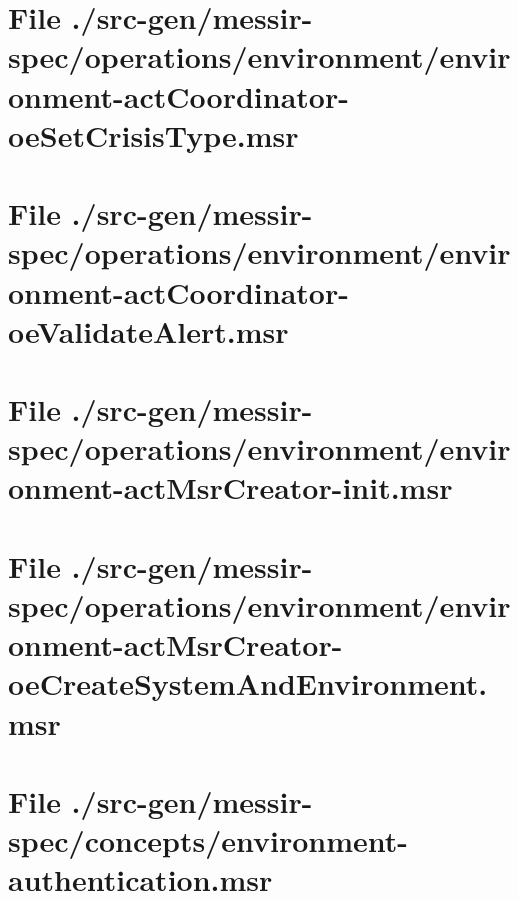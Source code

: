 \section[File /src-gen/messir-spec.../environment-actCoordinator-oeSetCrisisType.msr]{File ./src-gen/messir-spec/operations/environment/environment-actCoordinator-oeSetCrisisType.msr}
\scriptsize

\normalsize
	
\section[File /src-gen/messir-spec.../environment-actCoordinator-oeValidateAlert.msr]{File ./src-gen/messir-spec/operations/environment/environment-actCoordinator-oeValidateAlert.msr}
\scriptsize

\normalsize
	
\section[File /src-gen/messir-spec/operations.../environment-actMsrCreator-init.msr]{File ./src-gen/messir-spec/operations/environment/environment-actMsrCreator-init.msr}
\scriptsize

\normalsize
	
\section[File /src-gen.../environment-actMsrCreator-oeCreateSystemAndEnvironment.msr]{File ./src-gen/messir-spec/operations/environment/environment-actMsrCreator-oeCreateSystemAndEnvironment.msr}
\scriptsize

\normalsize
	
\section[File /src-gen/messir-spec/concepts/environment-authentication.msr]{File ./src-gen/messir-spec/concepts/environment-authentication.msr}
\scriptsize

\normalsize
	
